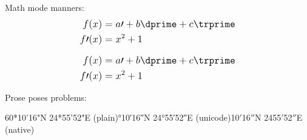 \documentclass{article}
\begin{document}
\fontsize{12}{16}
\selectfont

Math mode manners:
\[\mathlarger{\begin{aligned}
	f(x) & = a\prime + b\dprime + c\trprime \\
	f\prime(x) & = x^{2} + 1
\end{aligned}}\]

\[\mathlarger{\begin{aligned}
	f(x) & = a\prime + b\dprime + c\trprime \\
	f\prime(x) & = x^{2} + 1
\end{aligned}}\]

Prose poses problems:
\smallskip

\raggedright{
	60*10'16"N 24*55'52"E (plain)°10′16″N 24°55′52″E (unicode)\textdegree{}10\ensuremath{\prime}16\ensuremath{\dprime}N 24\textdegree{}55\ensuremath{\prime}52\ensuremath{\dprime}E (native)
}
\end{document}
